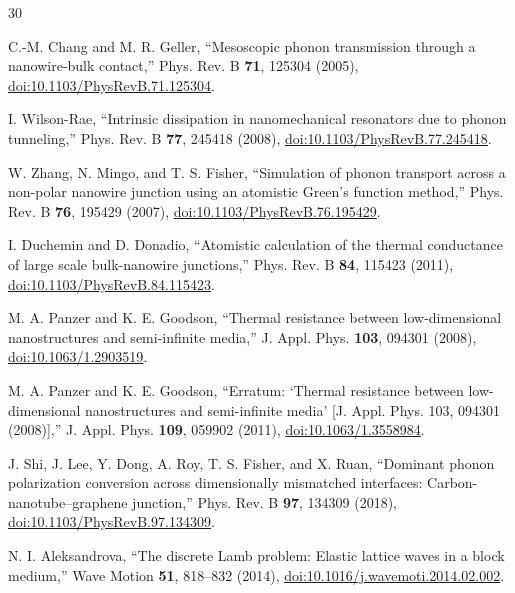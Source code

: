 \documentclass[10pt,aps,onecolumn,floatfix,notitlepage,nofootinbib,showkeys]{revtex4-2}
\begin{document}
\begin{thebibliography}{30}
\scriptsize
\setlength{\itemsep}{0pt}
\setlength{\parskip}{0pt}

C.-M. Chang and M. R. Geller,
``Mesoscopic phonon transmission through a nanowire-bulk contact,''
Phys. Rev. B \textbf{71}, 125304 (2005),
\href{https://doi.org/10.1103/PhysRevB.71.125304}{doi:10.1103/PhysRevB.71.125304}.

I. Wilson-Rae,
``Intrinsic dissipation in nanomechanical resonators due to phonon tunneling,''
Phys. Rev. B \textbf{77}, 245418 (2008),
\href{https://doi.org/10.1103/PhysRevB.77.245418}{doi:10.1103/PhysRevB.77.245418}.

W. Zhang, N. Mingo, and T. S. Fisher,
``Simulation of phonon transport across a non-polar nanowire junction using an atomistic Green's function method,''
Phys. Rev. B \textbf{76}, 195429 (2007),
\href{https://doi.org/10.1103/PhysRevB.76.195429}{doi:10.1103/PhysRevB.76.195429}.

I. Duchemin and D. Donadio,
``Atomistic calculation of the thermal conductance of large scale bulk-nanowire junctions,''
Phys. Rev. B \textbf{84}, 115423 (2011),
\href{https://doi.org/10.1103/PhysRevB.84.115423}{doi:10.1103/PhysRevB.84.115423}.

M. A. Panzer and K. E. Goodson,
``Thermal resistance between low-dimensional nanostructures and semi-infinite media,''
J. Appl. Phys. \textbf{103}, 094301 (2008),
\href{https://doi.org/10.1063/1.2903519}{doi:10.1063/1.2903519}.

M. A. Panzer and K. E. Goodson,
``Erratum: `Thermal resistance between low-dimensional nanostructures and semi-infinite media' [J. Appl. Phys. 103, 094301 (2008)],''
J. Appl. Phys. \textbf{109}, 059902 (2011),
\href{https://doi.org/10.1063/1.3558984}{doi:10.1063/1.3558984}.

J. Shi, J. Lee, Y. Dong, A. Roy, T. S. Fisher, and X. Ruan,
``Dominant phonon polarization conversion across dimensionally mismatched interfaces: Carbon-nanotube--graphene junction,''
Phys. Rev. B \textbf{97}, 134309 (2018),
\href{https://doi.org/10.1103/PhysRevB.97.134309}{doi:10.1103/PhysRevB.97.134309}.

N. I. Aleksandrova,
``The discrete Lamb problem: Elastic lattice waves in a block medium,''
Wave Motion \textbf{51}, 818--832 (2014),
\href{https://doi.org/10.1016/j.wavemoti.2014.02.002}{doi:10.1016/j.wavemoti.2014.02.002}.


\end{thebibliography}
\end{document}
